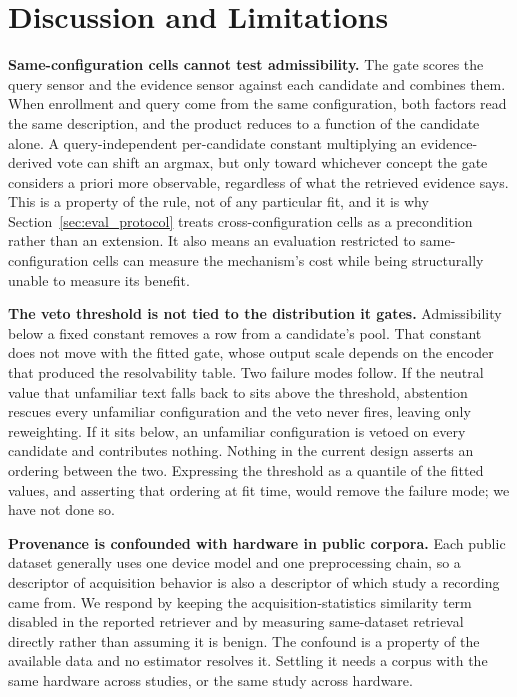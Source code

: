 \section{Discussion and Limitations}
\label{sec:discussion}

\textbf{Same-configuration cells cannot test admissibility.}
The gate scores the query sensor and the evidence sensor against each candidate and combines them.
When enrollment and query come from the same configuration, both factors read the same description,
and the product reduces to a function of the candidate alone. A query-independent per-candidate
constant multiplying an evidence-derived vote can shift an argmax, but only toward whichever concept
the gate considers a priori more observable, regardless of what the retrieved evidence says. This is
a property of the rule, not of any particular fit, and it is why
Section~\ref{sec:eval_protocol} treats cross-configuration cells as a precondition rather than an
extension. It also means an evaluation restricted to same-configuration cells can measure the
mechanism's cost while being structurally unable to measure its benefit.

\textbf{The veto threshold is not tied to the distribution it gates.}
Admissibility below a fixed constant removes a row from a candidate's pool. That constant does not
move with the fitted gate, whose output scale depends on the encoder that produced the resolvability
table. Two failure modes follow. If the neutral value that unfamiliar text falls back to sits above
the threshold, abstention rescues every unfamiliar configuration and the veto never fires, leaving
only reweighting. If it sits below, an unfamiliar configuration is vetoed on every candidate and
contributes nothing. Nothing in the current design asserts an ordering between the two. Expressing
the threshold as a quantile of the fitted values, and asserting that ordering at fit time, would
remove the failure mode; we have not done so.

\textbf{Provenance is confounded with hardware in public corpora.}
Each public dataset generally uses one device model and one preprocessing chain, so a descriptor of
acquisition behavior is also a descriptor of which study a recording came from. We respond by
keeping the acquisition-statistics similarity term disabled in the reported retriever and by
measuring same-dataset retrieval directly rather than assuming it is benign. The confound is a
property of the available data and no estimator resolves it. Settling it needs a corpus with the
same hardware across studies, or the same study across hardware.

